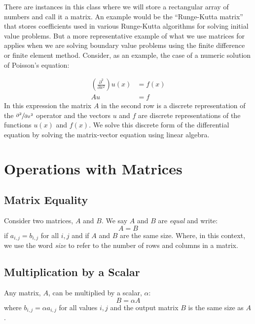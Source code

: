 There are instances in this class where we will store a rectangular array of numbers and call it a matrix.  An example would be the ``Runge-Kutta matrix'' that stores coefficients used in various Runge-Kutta algorithms for solving initial value problems.  But a more representative example of what we use matrices for applies when we are solving boundary value problems using the finite difference or finite element method.  Consider, as an example, the case of a numeric solution of Poisson's equation:

\begin{align*}
\left(\frac{\partial^2 }{\partial x^2} \right)u(x) &= f(x) \\
Au &= f
\end{align*} 
In this expression the matrix $A$ in the second row is a discrete representation of the $\sfrac{\partial^2 }{\partial x^2}$ operator and the vectors $u$ and $f$ are discrete representations of the functions $u(x)$ and $f(x)$.  We solve this discrete form of the differential equation by solving the matrix-vector equation using linear algebra.


\section{Operations with Matrices}

\subsection{Matrix Equality}
Consider two matrices, $A$ and $B$.  We say $A$ and $B$ are \emph{equal} and write:
\begin{equation*}
A = B
\end{equation*}
if $a_{i,j} = b_{i,j}$ for all $i,j$ and if $A$ and $B$ are the same size.  Where, in this context, we use the word \emph{size} to refer to the number of rows and columns in a matrix.

\subsection{Multiplication by a Scalar}
Any matrix, $A$, can be multiplied by a scalar, $\alpha$:
\begin{equation*}
B = \alpha A
\end{equation*}
where $b_{i,j} = \alpha a_{i,j}$ for  all values $i,j$ and the output matrix $B$ is the same size as $A$.

